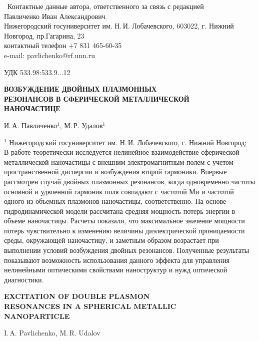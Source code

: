 \documentclass[12pt, a4paper]{article}
\begin{document}
\thispagestyle{empty}

 \ Контактные данные автора, ответственного за связь с редакцией\\
Павличенко Иван Александрович\\
Нижегородский госуниверситет им. Н.\,И. Лобачевского, 603022, г. Нижний Новгород, пр.Гагарина, 23\\
контактный телефон {+7 831 465-60-35}\\
e-mail: pavlichenko@rf.unn.ru 

\newpage
\setcounter{page}{1}

УДК 533.98{:}533.9...12
\begin{center}
\large\bf ВОЗБУЖДЕНИЕ ДВОЙНЫХ ПЛАЗМОННЫХ\\ РЕЗОНАНСОВ В СФЕРИЧЕСКОЙ МЕТАЛЛИЧЕСКОЙ\\НАНОЧАСТИЦЕ
\end{center}

И.\,А. Павличенко$^{1}$, М.\,Р. Удалов$^{1}$

$^1$ Нижегородский госуниверситет им. Н.\,И. Лобачевского, г. Нижний Новгород;\\

В работе теоретически исследуется нелинейное взаимодействие сферической металлической наночастицы с внешним электромагнитным полем с учетом пространственной дисперсии и возбуждения второй гармоники.
Впервые рассмотрен случай двойных плазмонных резонансов, когда одновременно частоты основной и удвоенной гармоник поля совпадают с частотой Ми и частотой одного из объемных плазмонов наночастицы, соответственно.
На основе гидродинамической модели рассчитана средняя мощность потерь энергии в объеме наночастицы.
Расчеты показали, что максимальное значение мощности потерь 
чувствительно к изменению величины диэлектрической проницаемости среды, окружающей наночастицу, и заметным образом возрастает при выполнении условий возбуждения двойных резонансов.
Полученные результаты показывают возможность использования данного эффекта для управления нелинейными оптическими свойствами наноструктур и нужд оптической диагностики.


\newpage
\begin{center}
{\large\bf EXCITATION OF DOUBLE PLASMON\\ RESONANCES IN A SPHERICAL METALLIC\\ NANOPARTICLE}
\end{center}

I.\,A. Pavlichenko, M.\,R. Udalov
\end{document}
